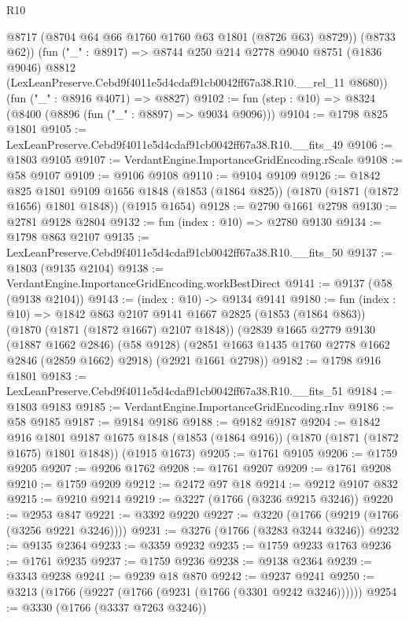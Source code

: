 \begin{lexlean}{R10}
\begin{coremodule}
        @8717
        (@8704 @64 @66 @1760 @1760 @63 @1801 (@8726 @63) @8729))
      (@8733 @62))
    (fun ("_" : @8917) =>
    @8744
      @250
      @214
      @2778
      @9040
      @8751
      (@1836 @9046)
      @8812
      (LexLeanPreserve.Cebd9f4011e5d4cdaf91cb0042ff67a38.R10.__rel_11 @8680))
    (fun ("_" : @8916 @4071) => @8827)
@9102 := fun (step : @10) => @8324 (@8400 (@8896 (fun ("_" : @8897) => @9034 @9096)))
@9104 := @1798 @825 @1801
@9105 := LexLeanPreserve.Cebd9f4011e5d4cdaf91cb0042ff67a38.R10.__fits_49
@9106 := @1803 @9105
@9107 := VerdantEngine.ImportanceGridEncoding.rScale
@9108 := @58 @9107
@9109 := @9106 @9108
@9110 := @9104 @9109
@9126 := @1842
    @825
    @1801
    @9109
    @1656
    @1848
    (@1853 (@1864 @825))
    (@1870 (@1871 (@1872 @1656) @1801 @1848))
    (@1915 @1654)
@9128 := @2790 @1661 @2798
@9130 := @2781 @9128 @2804
@9132 := fun (index : @10) => @2780 @9130
@9134 := @1798 @863 @2107
@9135 := LexLeanPreserve.Cebd9f4011e5d4cdaf91cb0042ff67a38.R10.__fits_50
@9137 := @1803 (@9135 @2104)
@9138 := VerdantEngine.ImportanceGridEncoding.workBestDirect
@9141 := @9137 (@58 (@9138 @2104))
@9143 := (index : @10) -> @9134 @9141
@9180 := fun (index : @10) =>
  @1842
    @863
    @2107
    @9141
    @1667
    @2825
    (@1853 (@1864 @863))
    (@1870 (@1871 (@1872 @1667) @2107 @1848))
    (@2839
      @1665
      @2779
      @9130
      (@1887 @1662 @2846)
      (@58 @9128)
      (@2851 @1663 @1435 @1760 @2778 @1662 @2846 (@2859 @1662) @2918)
      (@2921 @1661 @2798))
@9182 := @1798 @916 @1801
@9183 := LexLeanPreserve.Cebd9f4011e5d4cdaf91cb0042ff67a38.R10.__fits_51
@9184 := @1803 @9183
@9185 := VerdantEngine.ImportanceGridEncoding.rInv
@9186 := @58 @9185
@9187 := @9184 @9186
@9188 := @9182 @9187
@9204 := @1842
    @916
    @1801
    @9187
    @1675
    @1848
    (@1853 (@1864 @916))
    (@1870 (@1871 (@1872 @1675) @1801 @1848))
    (@1915 @1673)
@9205 := @1761 @9105
@9206 := @1759 @9205
@9207 := @9206 @1762
@9208 := @1761 @9207
@9209 := @1761 @9208
@9210 := @1759 @9209
@9212 := @2472 @97 @18
@9214 := @9212 @9107 @832
@9215 := @9210 @9214
@9219 := @3227 (@1766 (@3236 @9215 @3246))
@9220 := @2953 @847
@9221 := @3392 @9220
@9227 := @3220 (@1766 (@9219 (@1766 (@3256 @9221 @3246))))
@9231 := @3276 (@1766 (@3283 @3244 @3246))
@9232 := @9135 @2364
@9233 := @3359 @9232
@9235 := @1759 @9233 @1763
@9236 := @1761 @9235
@9237 := @1759 @9236
@9238 := @9138 @2364
@9239 := @3343 @9238
@9241 := @9239 @18 @870
@9242 := @9237 @9241
@9250 := @3213 (@1766 (@9227 (@1766 (@9231 (@1766 (@3301 @9242 @3246))))))
@9254 := @3330 (@1766 (@3337 @7263 @3246))

\end{coremodule}
\end{lexlean}
